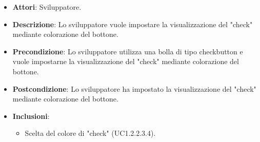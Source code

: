 
\FloatBarrier
\begin{itemize}
\item\textbf{Attori}: Sviluppatore.
\item\textbf{Descrizione}: Lo sviluppatore vuole impostare la visualizzazione del "check" mediante colorazione del bottone.
\item\textbf{Precondizione}: Lo sviluppatore utilizza una bolla di tipo checkbutton e vuole impostarne la visualizzazione del "check" mediante colorazione del bottone.
\item\textbf{Postcondizione}: Lo sviluppatore ha impostato la visualizzazione del "check" mediante colorazione del bottone.
\item \textbf{Inclusioni}: 
\begin{itemize}
\item Scelta del colore di "check" (UC1.2.2.3.4).
\end{itemize}
\end{itemize}
